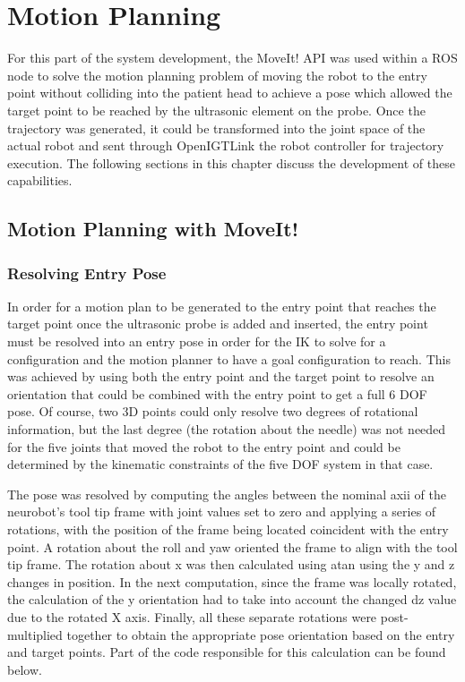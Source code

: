 \documentclass[12pt]{report}
\begin{document}
\chapter{Motion Planning}
For this part of the system development, the MoveIt! API was used within a ROS node to solve the motion planning problem of moving the robot to the entry point without colliding into the patient head to achieve a pose which allowed the target point to be reached by the ultrasonic element on the probe. Once the trajectory was generated, it could be transformed into the joint space of the actual robot and sent through OpenIGTLink the robot controller for trajectory execution. The following sections in this chapter discuss the development of these capabilities.  


\section{Motion Planning with MoveIt!}
\subsection{Resolving Entry Pose}
In order for a motion plan to be generated to the entry point that reaches the target point once the ultrasonic probe is added and inserted, the entry point must be resolved into an entry pose in order for the IK to solve for a configuration and the motion planner to have a goal configuration to reach. This was achieved by using both the entry point and the target point to resolve an orientation that could be combined with the entry point to get a full 6 DOF pose. Of course, two 3D points could only resolve two degrees of rotational information, but the last degree (the rotation about the needle) was not needed for the five joints that moved the robot to the entry point and could be determined by the kinematic constraints of the five DOF system in that case. 

The pose was resolved by computing the angles between the nominal axii of the neurobot's tool tip frame with joint values set to zero and applying a series of rotations, with the position of the frame being located coincident with the entry point. A rotation about the roll and yaw oriented the frame to align with the tool tip frame. The rotation about x was then calculated using atan using the y and z changes in position. In the next computation, since the frame was locally rotated, the calculation of the y orientation had to take into account the changed dz value due to the rotated X axis. Finally, all these separate rotations were post-multiplied together to obtain the appropriate pose orientation based on the entry and target points. Part of the code responsible for this calculation can be found below.
\end{document}
